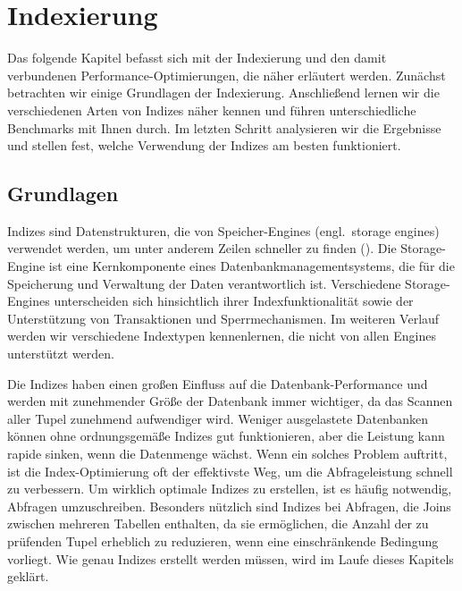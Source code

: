 
\chapter{Indexierung}\label{ch:indexing}

Das folgende Kapitel befasst sich mit der Indexierung und den damit verbundenen Performance-Optimierungen, die näher erläutert werden.
Zunächst betrachten wir einige Grundlagen der Indexierung.
Anschließend lernen wir die verschiedenen Arten von Indizes näher kennen und führen unterschiedliche Benchmarks mit Ihnen durch.
Im letzten Schritt analysieren wir die Ergebnisse und stellen fest, welche Verwendung der Indizes am besten funktioniert.

\section{Grundlagen}\label{sec:indexing-grundlagen}

Indizes sind Datenstrukturen, die von Speicher-Engines (engl.\ storage engines) verwendet werden, um unter anderem Zeilen schneller zu finden (\cite[pp. 147--189]{schwartz2012high}).
Die Storage-Engine ist eine Kernkomponente eines Datenbankmanagementsystems, die für die Speicherung und Verwaltung der Daten verantwortlich ist.
Verschiedene Storage-Engines unterscheiden sich hinsichtlich ihrer Indexfunktionalität sowie der Unterstützung von Transaktionen und Sperrmechanismen.
Im weiteren Verlauf werden wir verschiedene Indextypen kennenlernen, die nicht von allen Engines unterstützt werden.

Die Indizes haben einen großen Einfluss auf die Datenbank-Performance und werden mit zunehmender Größe der Datenbank immer wichtiger, da das Scannen aller Tupel zunehmend aufwendiger wird.
Weniger ausgelastete Datenbanken können ohne ordnungsgemäße Indizes gut funktionieren, aber die Leistung kann rapide sinken, wenn die Datenmenge wächst.
Wenn ein solches Problem auftritt, ist die Index-Optimierung oft der effektivste Weg, um die Abfrageleistung schnell zu verbessern.
Um wirklich optimale Indizes zu erstellen, ist es häufig notwendig, Abfragen umzuschreiben.
Besonders nützlich sind Indizes bei Abfragen, die Joins zwischen mehreren Tabellen enthalten, da sie ermöglichen, die Anzahl der zu prüfenden Tupel erheblich zu reduzieren, wenn eine einschränkende Bedingung vorliegt.
Wie genau Indizes erstellt werden müssen, wird im Laufe dieses Kapitels geklärt.


